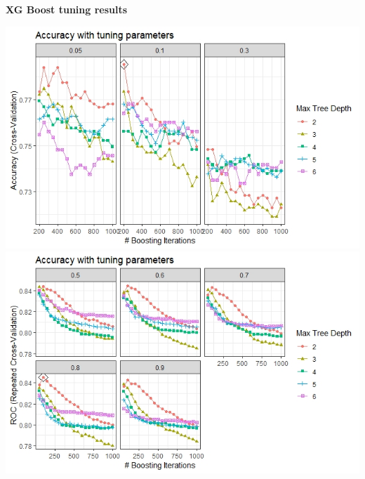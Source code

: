 \documentclass[]{article}
\begin{document}
\textbf{XG Boost tuning results}

\includegraphics[width=9.19in]{tuning1_boost}
\includegraphics[width=9.19in]{tuning_performance}
\end{document}
